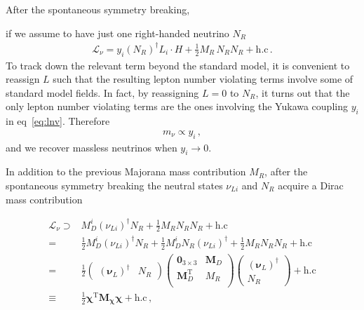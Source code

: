 After the spontaneous symmetry breaking,
\begin{frame}
if we assume to have just one right-handed neutrino $N_R$ 
\begin{align}
  \label{eq:lnv}
  \mathcal{L}_{\nu}=y_{i} \left( N_R \right)^{\dagger} L_i\cdot  H   
  +\tfrac{1}{2} M_R\, N_R  N_R + \text{h.c}\,.
\end{align}
To track down the relevant term beyond the standard model, it is convenient to reassign $L$ such that the resulting lepton number violating terms involve some of standard model fields. In fact, by reassigning $L=0$ to $N_R$, it turns out that the only lepton number violating terms are the ones involving the Yukawa coupling $y_i$ in eq~\eqref{eq:lnv}. Therefore
\begin{align}
  m_{\nu}\propto y_i\,,
\end{align}
and we recover massless neutrinos when $y_i\to 0$.

\end{frame}
\begin{frame}
In addition to the previous Majorana mass contribution $M_R$, after the spontaneous symmetry breaking the neutral states $\nu_{Li}$ and $N_R$  acquire a Dirac mass contribution

\begin{align}
  \mathcal{L}_{\nu}\supset & M_D^{i} \left( \nu_{Li} \right)^{\dagger} N_R +\frac{1}{2} M_R N_R N_R +\text{h.c} \nonumber\\
  =&  \frac{1}{2}M_D^{i} \left( \nu_{Li} \right)^{\dagger} N_R
     +\frac{1}{2}M_D^{i} N_R\left( \nu_{Li} \right)^{\dagger} +\frac{1}{2} M_R N_R N_R +\text{h.c} \nonumber\\
  =&\frac{1}{2}\begin{pmatrix} \left( \boldsymbol{\nu}_{L} \right)^{\dagger}  & N_R  \end{pmatrix}
 \begin{pmatrix}
   \mathbf{0}_{3 \times 3} &            \boldsymbol{M}_D \\
   \boldsymbol{M}_D^{\operatorname{T}} & M_R \\
 \end{pmatrix}
\begin{pmatrix} \left( \boldsymbol{\nu}_{L} \right)^{\dagger}  \\
    N_R  \end{pmatrix}+\text{h.c} \nonumber\\
  \equiv&\frac{1}{2} \boldsymbol{\chi}^{\operatorname{T}} \boldsymbol{M_{\chi}} \boldsymbol{\chi}+\text{h.c}\,,
\end{align}
\end{frame}
